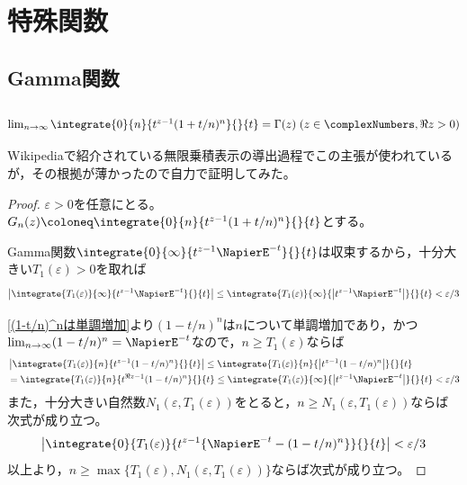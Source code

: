\chapter{特殊関数}
    \section{Gamma関数}
        \subsection{\texorpdfstring{$\lim_{n\to\infty} \integrate{0}{n}{t^{z-1}(1+t/n)^n}{}{t} = \Gamma(z)\;(z\in\complexNumbers, \Re{z} > 0)$}{Gamma関数の無限乗積表示}}
            Wikipediaで紹介されている無限乗積表示の導出過程でこの主張が使われているが，その根拠が薄かったので自力で証明してみた。
            \begin{proof}
                \quad\par
                $\varepsilon>0$を任意にとる。
                $G_n(z) \coloneq \integrate{0}{n}{t^{z-1}(1+t/n)^n}{}{t}$とする。
                \par
                Gamma関数$\integrate{0}{\infty}{t^{z-1}\NapierE^{-t}}{}{t}$は収束するから，十分大きい$T_1(\varepsilon)>0$を取れば
                \[ \left|\integrate{T_1(\varepsilon)}{\infty}{t^{z-1}\NapierE^{-t}}{}{t}\right| \leq \integrate{T_1(\varepsilon)}{\infty}{\left|t^{z-1}\NapierE^{-t}\right|}{}{t} < \varepsilon/3 \]
                \par
                \ref{(1-t/n)^nは単調増加}より$(1-t/n)^n$は$n$について単調増加であり，かつ$\lim_{n\to\infty}(1-t/n)^n = \NapierE^{-t}$なので，$n \geq T_1(\varepsilon)$ならば
                \begin{align*}
                    &\left|\integrate{T_1(\varepsilon)}{n}{t^{z-1}(1-t/n)^n}{}{t}\right| \leq \integrate{T_1(\varepsilon)}{n}{\left|t^{z-1}(1-t/n)^n\right|}{}{t} \\
                    &= \integrate{T_1(\varepsilon)}{n}{t^{\Re{z}-1}(1-t/n)^n}{}{t} \leq \integrate{T_1(\varepsilon)}{\infty}{\left|t^{z-1}\NapierE^{-t}\right|}{}{t} < \varepsilon/3
                \end{align*}
                また，十分大きい自然数$N_1(\varepsilon,T_1(\varepsilon))$をとると，$n \geq N_1(\varepsilon,T_1(\varepsilon))$ならば次式が成り立つ。
                \[ \left|\integrate{0}{T_1(\varepsilon)}{t^{z-1}\{\NapierE^{-t} - (1-t/n)^n\}}{}{t}\right| < \varepsilon/3 \]
                以上より，$n \geq \max\{T_1(\varepsilon), N_1(\varepsilon,T_1(\varepsilon))\}$ならば次式が成り立つ。

\end{proof}
